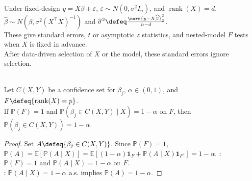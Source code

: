 \begin{remark} \label{rem:sl-linear-inference-after-model-choice} \\
Under fixed-design $y=X\beta+\varepsilon$, $\varepsilon\sim N(0,\sigma^2I_n)$, and $\operatorname{rank}(X)=d$, $\widehat{\beta}\sim N(\beta,\sigma^2(X^\top X)^{-1})$ and $\widehat{\sigma}^2\defeq\frac{\norm{y-X\widehat{\beta}}_2^2}{n-d}$.\\
These give standard errors, $t$ or asymptotic $z$ statistics, and nested-model $F$ tests when $X$ is fixed in advance.\\
After data-driven selection of $X$ or the model, these standard errors ignore selection.
\end{remark}

\begin{proposition} \label{prop:fixed-design-intervals-unconditional-coverage} \\
Let $C(X,Y)$ be a confidence set for $\beta_j$, $\alpha\in(0,1)$, and $F\defeq\{\operatorname{rank}(X)=p\}$.\\
If $\mathbb{P}(F)=1$ and $\mathbb{P}(\beta_j\in C(X,Y)\mid X)=1-\alpha$ on $F$, then $\mathbb{P}(\beta_j\in C(X,Y))=1-\alpha$.
\begin{proof}
Set $A\defeq\{\beta_j\in C(X,Y)\}$. Since $\mathbb{P}(F)=1$, $\mathbb{P}(A)=\mathbb{E}[\mathbb{P}(A\mid X)]=\mathbb{E}[(1-\alpha)\mathbf{1}_F+\mathbb{P}(A\mid X)\mathbf{1}_{F^c}]=1-\alpha$.
: $\mathbb{P}(F)=1$ and $\mathbb{P}(A\mid X)=1-\alpha$ on $F$.\\
: $\mathbb{P}(A\mid X)=1-\alpha$ a.s. implies $\mathbb{P}(A)=1-\alpha$.
\end{proof}
\end{proposition}


